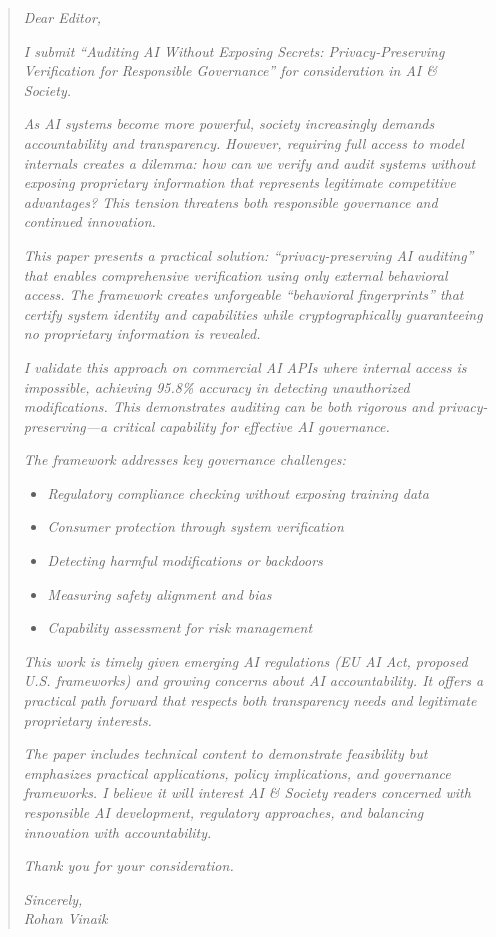 \documentclass[12pt]{article}
\begin{document}
\begin{quote}
\textit{Dear Editor,}

\textit{I submit ``Auditing AI Without Exposing Secrets: Privacy-Preserving Verification for Responsible Governance'' for consideration in AI \& Society.}

\textit{As AI systems become more powerful, society increasingly demands accountability and transparency. However, requiring full access to model internals creates a dilemma: how can we verify and audit systems without exposing proprietary information that represents legitimate competitive advantages? This tension threatens both responsible governance and continued innovation.}

\textit{This paper presents a practical solution: ``privacy-preserving AI auditing'' that enables comprehensive verification using only external behavioral access. The framework creates unforgeable ``behavioral fingerprints'' that certify system identity and capabilities while cryptographically guaranteeing no proprietary information is revealed.}

\textit{I validate this approach on commercial AI APIs where internal access is impossible, achieving 95.8\% accuracy in detecting unauthorized modifications. This demonstrates auditing can be both rigorous and privacy-preserving—a critical capability for effective AI governance.}

\textit{The framework addresses key governance challenges:}
\begin{itemize}
\item \textit{Regulatory compliance checking without exposing training data}
\item \textit{Consumer protection through system verification}
\item \textit{Detecting harmful modifications or backdoors}
\item \textit{Measuring safety alignment and bias}
\item \textit{Capability assessment for risk management}
\end{itemize}

\textit{This work is timely given emerging AI regulations (EU AI Act, proposed U.S. frameworks) and growing concerns about AI accountability. It offers a practical path forward that respects both transparency needs and legitimate proprietary interests.}

\textit{The paper includes technical content to demonstrate feasibility but emphasizes practical applications, policy implications, and governance frameworks. I believe it will interest AI \& Society readers concerned with responsible AI development, regulatory approaches, and balancing innovation with accountability.}

\textit{Thank you for your consideration.}

\textit{Sincerely,}\\
\textit{Rohan Vinaik}
\end{quote}
\end{document}
